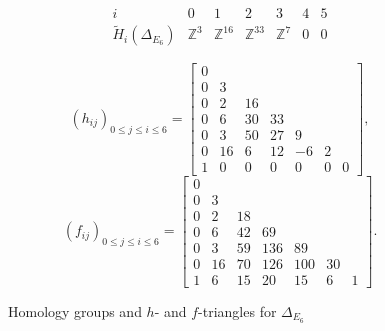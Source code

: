 \documentclass[11pt]{amsart}
\def\ZZ{\mathbb{Z}}
\theoremstyle{plain}
\numberwithin{lemma}{\DefaultNumberTheoremWithin}
\numberwithin{theorem}{\DefaultNumberTheoremWithin}
\numberwithin{corollary}{\DefaultNumberTheoremWithin}
\numberwithin{proposition}{\DefaultNumberTheoremWithin}
\numberwithin{conjecture}{\DefaultNumberTheoremWithin}
\theoremstyle{definition}
\numberwithin{definition}{\DefaultNumberTheoremWithin}
\numberwithin{question}{\DefaultNumberTheoremWithin}
\numberwithin{problem}{\DefaultNumberTheoremWithin}
\theoremstyle{remark}
\numberwithin{remark}{\DefaultNumberTheoremWithin}
\numberwithin{example}{\DefaultNumberTheoremWithin}
\numberwithin{claim}{\DefaultNumberTheoremWithin}
\begin{document}
\begin{figure}[H]
{\small
$$\begin{array}{c|cccccc} i & 0 & 1 & 2 & 3 & 4 & 5\\
\hline
\widetilde{H}_i(\Delta_{E_6}) & \ZZ^ 3 & \ZZ^{16} & \ZZ^{33} & \ZZ^ 7 & 0 & 0 
\end{array}$$

$$(h_{ij})_{0 \leq j \leq i \leq 6}  = \left[\begin{array}{ccccccc}
0 &   &     &     &     &    &  \\
0 & 3 &     &     &     &    &  \\
0 & 2 & 16  &     &     &    &  \\
0 & 6 & 30  & 33  &     &    &  \\
0 & 3 & 50  & 27 & 9  &    &  \\
0 & 16 & 6 & 12 & -6 & 2 & \\
1 & 0 & 0 & 0 & 0 & 0 & 0
\end{array}\right],$$
$$
(f_{ij})_{0 \leq j \leq i \leq 6} = \left[\begin{array}{ccccccc}
0 &   &     &     &     &    &  \\
0 & 3 &     &     &     &    &  \\
0 & 2 & 18  &     &     &    &  \\
0 & 6 & 42  & 69  &     &    &  \\
0 & 3 & 59  & 136 & 89  &    &  \\
0 & 16 & 70 & 126 & 100 & 30 & \\
1 & 6 & 15 & 20 & 15 & 6 & 1
\end{array}\right].$$}
 \caption{Homology groups and $h$- and $f$-triangles for $\Delta_{E_6}$}
\label{fig:e6}
\end{figure}
 
\end{document}
